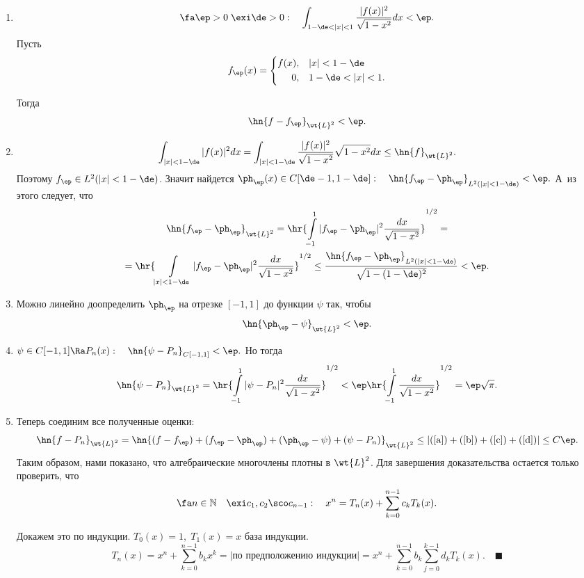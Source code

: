 \documentclass[a4paper]{article}
\begin{document}
\begin{enumerate}
\item
$$\fa\ep>0\;\exi\de>0:\quad\int_{1-\de<|x|<1}\frac{|f(x)|^2}{\sqrt{1-x^2}}dx<\ep.$$
Пусть
$$f_{\ep}(x)=\left\{\begin{aligned}f(x),&\quad|x|<1-\de\\
0,&\quad1-\de<|x|<1.\end{aligned}\right.$$

Тогда
\begin{equation}\label{a}
\hn{f-f_{\ep}}_{\wt{L}^2}<\ep.
\end{equation}
\item
$$\int_{|x|<1-\de}|f(x)|^2dx=\int_{|x|<1-\de}\frac{|f(x)|^2}{\sqrt{1-x^2}}\sqrt{1-x^2}dx\le\hn{f}_{\wt{L}^2}.$$
Поэтому $f_{\ep}\in L^2(|x|<1-\de)$. Значит найдется $\ph_{\ep}(x)\in
C[\de-1,1-\de]:\quad\hn{f_{\ep}-\ph_{\ep}}_{L^2(|x|<1-\de)}<\ep.$ А~из этого
следует, что
\begin{multline}\label{b}
\hn{f_{\ep}-\ph_{\ep}}_{\wt{L}^2}=\hr{\int\limits_{-1}^1|f_{\ep}-\ph_{\ep}|^2\frac{dx}{\sqrt{1-x^2}}}^{1/2}=\\
=\hr{\int\limits_{|x|<1-\de}|f_{\ep}-\ph_{\ep}|^2\frac{dx}{\sqrt{1-x^2}}}^{1/2}\le\frac{\hn{f_{\ep}-\ph_{\ep}}_{L^2(|x|<1-\de)}}{\sqrt{1-(1-\de)^2}}<\ep.
\end{multline}

\item
Можно линейно доопределить $\ph_{\ep}$ на отрезке
$[-1,1]$ до функции $\psi$ так, чтобы
\begin{equation}\label{c}
\hn{\ph_{\ep}-\psi}_{\wt{L}^2}<\ep.
\end{equation}
\item
$\psi\in C[-1,1]\Ra P_n(x):\quad
\hn{\psi-P_n}_{C[-1,1]}<\ep.$ Но тогда
\begin{equation}\label{d}
\hn{\psi-P_n}_{\wt{L}^2}=\hr{\int\limits_{-1}^1|\psi-P_n|^2\frac{dx}{\sqrt{1-x^2}}}^{1/2}<\ep\hr{\int\limits_{-1}^1\frac{dx}{\sqrt{1-x^2}}}^{1/2}=\ep\sqrt{\pi}.
\end{equation}
\item
Теперь соединим все полученные оценки:
$$\hn{f-P_n}_{\wt{L}^2}=\hn{(f-f_{\ep})+(f_{\ep}-\ph_{\ep})+(\ph_{\ep}-\psi)+(\psi-P_n)}_{\wt{L}^2}\le|(\ref{a})+(\ref{b})+(\ref{c})+(\ref{d})|\le C\ep.$$
Таким образом, нами показано, что алгебраические многочлены плотны
в $\wt{L}^2$. Для завершения доказательства остается только
проверить, что
$$\fa n\in\mathbb{N}\quad\exi
c_1,c_2\sco c_{n-1}:\quad
x^n=T_n(x)+\sum_{k=0}^{n-1}c_kT_k(x).$$

Докажем это по индукции. $T_0(x)=1,\;T_1(x)=x$ база индукции.
$$T_n(x)=x^n+\sum_{k=0}^{n-1}b_kx^k=|\text{по предположению индукции}|=x^n+\sum_{k=0}^{n-1}b_k\sum_{j=0}^{k-1}d_kT_k(x).\quad\blacksquare$$



\end{enumerate}
\end{document}
